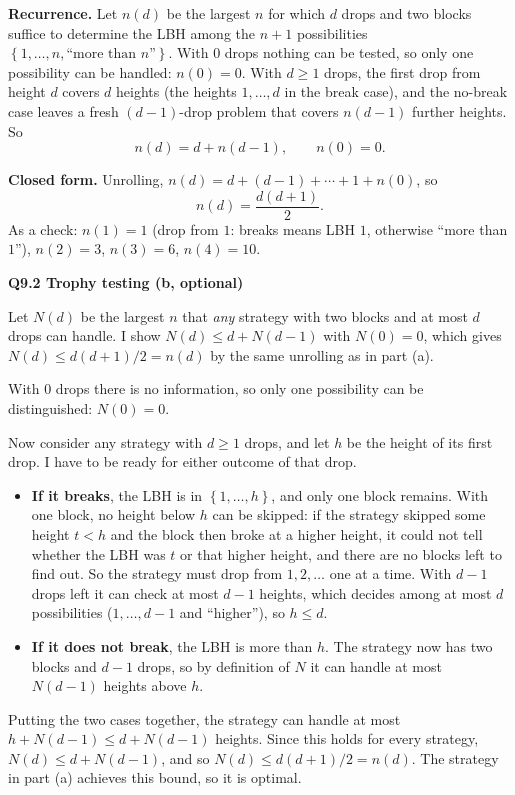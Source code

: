 \documentclass[11pt]{article}
\newcommand{\set}[1]{\left\{#1\right\}}
\newcommand{\qpage}[1]{\clearpage\noindent\textbf{\large #1}\par\medskip}
\begin{document}
\textbf{Recurrence.}
Let $n(d)$ be the largest $n$ for which $d$ drops and two blocks suffice to determine the LBH among the $n+1$ possibilities $\set{1, \ldots, n, \text{``more than } n\text{''}}$.
With $0$ drops nothing can be tested, so only one possibility can be handled: $n(0) = 0$.
With $d \ge 1$ drops, the first drop from height $d$ covers $d$ heights (the heights $1, \ldots, d$ in the break case), and the no-break case leaves a fresh $(d-1)$-drop problem that covers $n(d-1)$ further heights.
So
\[
  n(d) = d + n(d-1), \qquad n(0) = 0.
\]

\textbf{Closed form.}
Unrolling, $n(d) = d + (d-1) + \cdots + 1 + n(0)$, so
\[
  n(d) = \frac{d(d+1)}{2}.
\]
As a check: $n(1) = 1$ (drop from $1$: breaks means LBH $1$, otherwise ``more than $1$''), $n(2) = 3$, $n(3) = 6$, $n(4) = 10$.

\qpage{Q9.2 Trophy testing (b, optional)}

Let $N(d)$ be the largest $n$ that \emph{any} strategy with two blocks and at most $d$ drops can handle.
I show $N(d) \le d + N(d-1)$ with $N(0) = 0$, which gives $N(d) \le d(d+1)/2 = n(d)$ by the same unrolling as in part (a).

With $0$ drops there is no information, so only one possibility can be distinguished: $N(0) = 0$.

Now consider any strategy with $d \ge 1$ drops, and let $h$ be the height of its first drop.
I have to be ready for either outcome of that drop.
\begin{itemize}
  \item \textbf{If it breaks}, the LBH is in $\set{1, \ldots, h}$, and only one block remains.
  With one block, no height below $h$ can be skipped: if the strategy skipped some height $t < h$ and the block then broke at a higher height, it could not tell whether the LBH was $t$ or that higher height, and there are no blocks left to find out.
  So the strategy must drop from $1, 2, \ldots$ one at a time.
  With $d-1$ drops left it can check at most $d-1$ heights, which decides among at most $d$ possibilities ($1, \ldots, d-1$ and ``higher''), so $h \le d$.
  \item \textbf{If it does not break}, the LBH is more than $h$.
  The strategy now has two blocks and $d-1$ drops, so by definition of $N$ it can handle at most $N(d-1)$ heights above $h$.
\end{itemize}
Putting the two cases together, the strategy can handle at most $h + N(d-1) \le d + N(d-1)$ heights.
Since this holds for every strategy, $N(d) \le d + N(d-1)$, and so $N(d) \le d(d+1)/2 = n(d)$.
The strategy in part (a) achieves this bound, so it is optimal.
\end{document}
